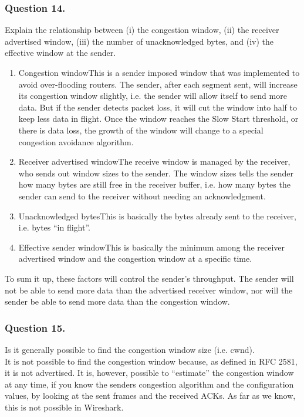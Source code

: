 \documentclass{mall}
\begin{document}
\subsubsection{Question 14.}
Explain the relationship between (i) the congestion window, (ii) the receiver advertised window, (iii) the number of unacknowledged bytes, and (iv) the effective window at the sender.

\begin{enumerate}
\item{Congestion window\newline This is a sender imposed window that was implemented to avoid over-flooding routers. The sender, after each segment sent, will increase its congestion window slightly, i.e. the sender will allow itself to send more data. But if the sender detects packet loss, it will cut the window into half to keep less data in flight. Once the window reaches the Slow Start threshold, or there is data loss, the growth of the window will change to a special congestion avoidance algorithm.}
\item{Receiver advertised window\newline The receive window is managed by the receiver, who sends out window sizes to the sender. The window sizes tells the sender how many bytes are still free in the receiver buffer, i.e. how many bytes the sender can send to the receiver without needing an acknowledgment.
}
\item{Unacknowledged bytes}\newline This is basically the bytes already sent to the receiver, i.e. bytes ``in flight''.
\item{Effective sender window\newline This is basically the minimum among the receiver advertised window and the congestion window at a specific time.}
\end{enumerate}
To sum it up, these factors will control the sender's throughput. The sender will not be able to send more data than the advertised receiver window, nor will the sender be able to send more data than the congestion window.
\pagebreak
\subsubsection{Question 15.}
Is it generally possible to find the congestion window size (i.e. cwnd).\\

It is not possible to find the congestion window because, as defined in RFC 2581, it is not advertised. It is, however, possible to ``estimate'' the congestion window at any time, if you know the senders congestion algorithm and the configuration values, by looking at the sent frames and the received ACKs. As far as we know, this is not possible in Wireshark.
\end{document}
